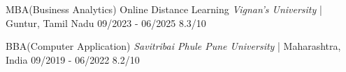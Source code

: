 



\begin{cvhonors}

  \cvhonor
    {\normalsize MBA(Business Analytics) Online Distance Learning} %
    {\textit{Vignan's University} | Guntur, Tamil Nadu} %
    {09/2023 - 06/2025} %
    {8.3/10} %
 
  \cvhonor
    {\normalsize BBA(Computer Application) } %
    {\textit{Savitribai Phule Pune University} | Maharashtra, India} %
    {09/2019 - 06/2022} %
    {8.2/10} %


\end{cvhonors}







    
